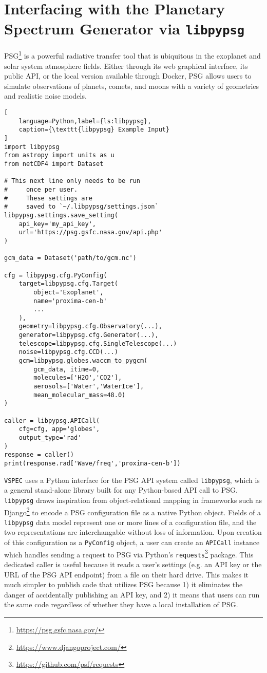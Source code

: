 \documentclass[linenumbers,preprint,authoryear]{elsarticle}
\newcommand{\vspec}[1]{\texttt{VSPEC}#1}
\begin{document}
\section{Interfacing with the Planetary Spectrum Generator via \texttt{libpypsg}}
\label{sec:libpypsg}
PSG\footnote{\url{https://psg.gsfc.nasa.gov/}} \citep{villanueva2018} is a powerful radiative transfer tool that is ubiquitous in the exoplanet and solar system atmosphere fields. Either through its web graphical interface, its public API, or the local version available through Docker, PSG allows users to simulate observations of planets, comets, and moons with a variety of geometries and realistic noise models.

\begin{lstlisting}[
    language=Python,label={ls:libpypsg},
    caption={\texttt{libpypsg} Example Input}
]
import libpypsg
from astropy import units as u
from netCDF4 import Dataset

# This next line only needs to be run
#     once per user.
#     These settings are 
#     saved to `~/.libpypsg/settings.json`
libpypsg.settings.save_setting(
    api_key='my_api_key',
    url='https://psg.gsfc.nasa.gov/api.php'
)

gcm_data = Dataset('path/to/gcm.nc')

cfg = libpypsg.cfg.PyConfig(
    target=libpypsg.cfg.Target(
        object='Exoplanet',
        name='proxima-cen-b'
        ...
    ),
    geometry=libpypsg.cfg.Observatory(...),
    generator=libpypsg.cfg.Generator(...),
    telescope=libpypsg.cfg.SingleTelescope(...)
    noise=libpypsg.cfg.CCD(...)
    gcm=libpypsg.globes.waccm_to_pygcm(
        gcm_data, itime=0,
        molecules=['H2O','CO2'],
        aerosols=['Water','WaterIce'],
        mean_molecular_mass=48.0)
)

caller = libpypsg.APICall(
    cfg=cfg, app='globes',
    output_type='rad'
)
response = caller()
print(response.rad['Wave/freq','proxima-cen-b'])
\end{lstlisting}

\vspec{} uses a Python interface for the PSG API system called \texttt{libpypsg}, which is a general stand-alone library built for any Python-based API call to PSG. \texttt{libpypsg} draws inspiration from object-relational mapping in frameworks such as Django\footnote{\url{https://www.djangoproject.com/}} to encode a PSG configuration file as a native Python object. Fields of a \texttt{libpypsg} data model represent one or more lines of a configuration file, and the two representations are interchangable without loss of information. Upon creation of this configuration as a \texttt{PyConfig} object, a user can create an \texttt{APICall} instance which handles sending a request to PSG via Python's \texttt{requests}\footnote{\url{https://github.com/psf/requests}} package. This dedicated caller is useful because it reads a user's settings (e.g. an API key or the URL of the PSG API endpoint) from a file on their hard drive. This makes it much simpler to publish code that utilizes PSG because 1) it eliminates the danger of accidentally publishing an API key, and 2) it means that users can run the same code regardless of whether they have a local installation of PSG.
\end{document}
